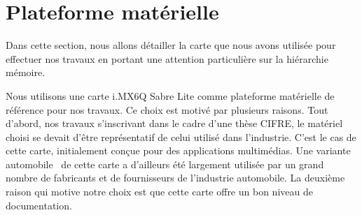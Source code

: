 
\section{Plateforme matérielle}
\label{section:plateforme_materielle}

    Dans cette section, nous allons détailler la carte que nous avons utilisée pour effectuer nos travaux en portant une attention particulière sur la hiérarchie mémoire.



    Nous utilisons une carte i.MX6Q Sabre Lite comme plateforme matérielle de référence pour nos travaux.
    Ce choix est motivé par plusieurs raisons.
    Tout d'abord, nos travaux s'inscrivant dans le cadre d'une thèse CIFRE, le matériel choisi se devait d'être représentatif de celui utilisé dans l'industrie.
    C'est le cas de cette carte, initialement conçue pour des applications multimédias.
    Une variante automobile~\cite{manuel:i_MX_6Dual_6Quad_automotive_and_infotainment_applications_processors} de cette carte a d'ailleurs été largement utilisée par un grand nombre de fabricants et de fournisseurs de l'industrie automobile.
    La deuxième raison qui motive notre choix est que cette carte offre un bon niveau de documentation.

